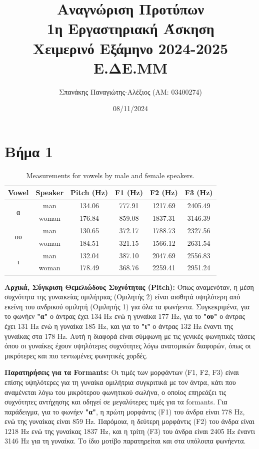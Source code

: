 \documentclass[a4paper,12pt]{article}
\title{Αναγνώριση Προτύπων \\ 1η Εργαστηριακή Άσκηση \\ Χειμερινό Εξάμηνο 2024-2025 \\ Ε.ΔE.ΜΜ}
\author{Σπανάκης Παναγιώτης-Αλέξιος (ΑΜ: 03400274)}
\date{08/11/2024}
\begin{document}
\maketitle
\section*{Βήμα 1}


\begin{table}[h!]
    \centering
    \begin{tabular}{|c|c|c|c|c|c|}
    \hline
    \textbf{Vowel} & \textbf{Speaker} & \textbf{Pitch (Hz)} & \textbf{F1 (Hz)} & \textbf{F2 (Hz)} & \textbf{F3 (Hz)} \\ \hline
    \multirow{2}{*}{α} & man & 134.06 & 777.91 & 1217.69 & 2405.49 \\ \cline{2-6} 
                       & woman & 176.84 & 859.08 & 1837.31 & 3146.39 \\ \hline
    \multirow{2}{*}{ου} & man & 130.65 & 372.17 & 1788.73 & 2327.56 \\ \cline{2-6} 
                        & woman & 184.51 & 321.15 & 1566.12 & 2631.54 \\ \hline
    \multirow{2}{*}{ι} & man & 132.04 & 387.10 & 2047.69 & 2556.83 \\ \cline{2-6} 
                       & woman & 178.49 & 368.76 & 2259.41 & 2951.24 \\ \hline
    \end{tabular}
    \caption{Measurements for vowels by male and female speakers.}
    \label{tab:vowels}
\end{table}

\textbf{Αρχικά, Σύγκριση Θεμελιώδους Συχνότητας (Pitch):}
Όπως αναμενόταν, η μέση συχνότητα της γυναικείας ομιλήτριας (Ομιλητής 2) είναι αισθητά υψηλότερη από εκείνη του ανδρικού ομιλητή (Ομιλητής 1) 
για όλα τα φωνήεντα. Συγκεκριμένα, για το φωνήεν \textbf{"α"} ο άντρας έχει 134 Hz ενώ η γυναίκα 177 Hz, για το \textbf{"ου"} ο 
άντρας έχει 131 Hz ενώ η γυναίκα 185 Hz, και για το \textbf{"ι"} ο άντρας 132 Hz έναντι της γυναίκας στα 178 Hz. 
Αυτή η διαφορά είναι σύμφωνη με τις γενικές φωνητικές τάσεις όπου οι γυναίκες έχουν υψηλότερες συχνότητες λόγω ανατομικών διαφορών, 
όπως οι μικρότερες και πιο τεντωμένες φωνητικές χορδές.

\textbf{Παρατηρήσεις για τα Formants:}
Οι τιμές των μορφάντων (F1, F2, F3) είναι επίσης υψηλότερες για τη γυναίκα ομιλήτρια συγκριτικά με τον άντρα, 
κάτι που αναμένεται λόγω του μικρότερου φωνητικού σωλήνα, ο οποίος επηρεάζει τις συχνότητες αντήχησης και οδηγεί σε 
μεγαλύτερες τιμές για τα formants. Για παράδειγμα, για το φωνήεν \textbf{"α"}, η πρώτη μορφάντις (F1) του άνδρα είναι 
778 Hz, ενώ της γυναίκας είναι 859 Hz. Παρόμοια, η δεύτερη μορφάντις (F2) του άνδρα είναι 1218 Hz ενώ της γυναίκας 
1837 Hz, και η τρίτη (F3) του άνδρα είναι 2405 Hz έναντι 3146 Hz για τη γυναίκα. Το ίδιο μοτίβο παρατηρείται και στα υπόλοιπα φωνήεντα.
\end{document}
